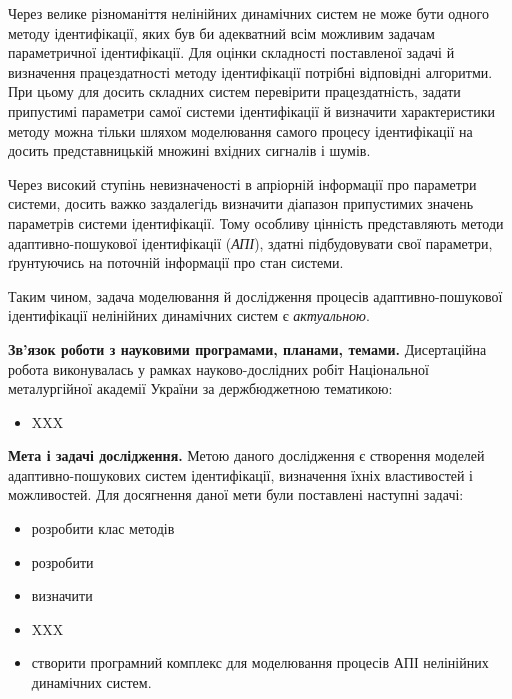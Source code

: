 \documentclass[a4paper,12pt]{atuaref}
\newcommand{\TermUse}[1]{\textit{#1}}
\begin{document}
Через велике різноманіття нелінійних динамічних систем не може бути одного
методу ідентифікації, яких був би адекватний
всім можливим задачам параметричної ідентифікації.
Для оцінки складності поставленої задачі й
визначення працездатності методу ідентифікації потрібні відповідні алгоритми.
При цьому для досить складних систем
перевірити працездатність, задати припустимі
параметри самої системи ідентифікації й визначити характеристики методу можна
тільки шляхом моделювання самого процесу ідентифікації
на досить представницькій
множині вхідних сигналів і шумів.

Через високий ступінь невизначеності в апріорній інформації про параметри
системи, досить важко заздалегідь визначити діапазон припустимих значень
параметрів системи ідентифікації. Тому особливу цінність представляють
методи адаптивно-пошукової ідентифікації (\TermUse{АПІ}),
здатні підбудовувати свої параметри, ґрунтуючись на
поточній інформації про стан системи.

Таким чином,
задача моделювання
й дослідження процесів адаптивно-пошукової
ідентифікації нелінійних динамічних систем є \textit{актуальною}.

\smallskip
\textbf{Зв'язок роботи з науковими програмами, планами, темами.}
Дисертаційна робота виконувалась у рамках науково-дослідних робіт
Національної металургійної академії України за держбюджетною
тематикою:

\begin{itemize}

\item XXX

\end{itemize}

\textbf{Мета і задачі дослідження.}
Метою даного дослідження є створення моделей адаптивно-пошукових
систем ідентифікації, визначення їхніх властивостей і можливостей.
Для досягнення даної мети були поставлені наступні задачі:

\begin{itemize}

\item розробити клас методів

\item розробити

\item визначити

\item XXX

\item створити програмний комплекс для моделювання
процесів АПІ
нелінійних динамічних систем.
\end{itemize}
\end{document}
